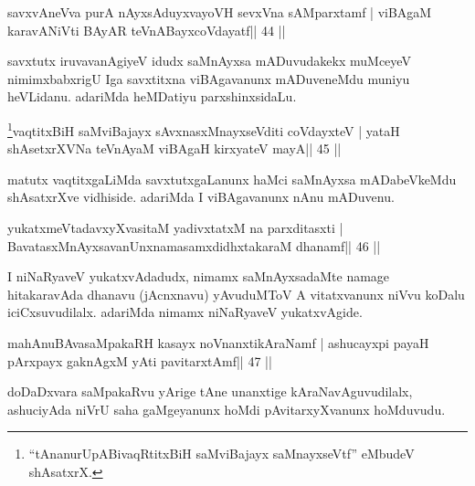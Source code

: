 
\begin{shl}
savxvAneVva purA nAyxsAduyxvayoVH sevxVna sAMparxtamf |
viBAgaM karavANiVti BAyAR teVnABayxcoVdayatf\hfill || 44 ||
\end{shl}

\begin{artha}
savxtutx iruvavanAgiyeV idudx saMnAyxsa mADuvudakekx muMceyeV
\break nimimxbabxrigU Iga savxtitxna viBAgavanunx mADuveneMdu muniyu
heVLidanu. adariMda heMDatiyu parxshinxsidaLu.
\end{artha}


\begin{shl}
\footnote{``tAnanurUpABivaqRtitxBiH saMviBajayx saMnayxseVtf'' eMbudeV shAsatxrX.}vaqtitxBiH saMviBajayx sAvxnasxMnayxseVditi coVdayxteV |
yataH shAsetxrXVNa teVnAyaM viBAgaH kirxyateV mayA\hfill || 45 ||
\end{shl}

\begin{artha}
matutx vaqtitxgaLiMda savxtutxgaLanunx haMci saMnAyxsa
mADabeVkeMdu shAsatxrXve vidhiside. adariMda I viBAgavanunx nAnu 
mADuvenu. 
\end{artha}


\begin{shl}
yukatxmeVtadavxyXvasitaM yadivxtatxM na parxditasxti |
BavatasxMnAyxsavanUnxnamasamxdidhxtakaraM dhanamf\hfill || 46 ||
\end{shl}

\begin{artha}
I niNaRyaveV yukatxvAdadudx, nimamx saMnAyxsadaMte namage hitakaravAda dhanavu (jAcnxnavu) yAvuduMToV A vitatxvanunx niVvu koDalu iciCxsuvudilalx. adariMda nimamx niNaRyaveV yukatxvAgide.
\end{artha}


\begin{shl}
mahAnuBAvasaMpakaRH kasayx noVnanxtikAraNamf |
ashucayxpi payaH pArxpayx gaknAgxM yAti pavitarxtAmf\hfill || 47 ||
\end{shl}

\begin{artha}
doDaDxvara saMpakaRvu yArige tAne unanxtige kAraNavAguvudilalx, ashuciyAda niVrU saha gaMgeyanunx hoMdi pAvitarxyXvanunx hoMduvudu.
\end{artha}

